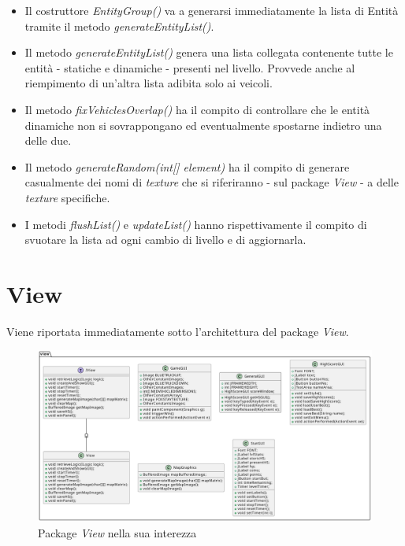 \documentclass[12pt,a4paper]{report}
\begin{document}
\begin{itemize}
\begin{itemize}
		\begin{itemize}
			\item Il costruttore \emph{EntityGroup()} va a generarsi immediatamente la lista di Entità tramite il metodo \emph{generateEntityList()}.
			\item Il metodo \emph{generateEntityList()} genera una lista collegata contenente tutte le entità - statiche e dinamiche - presenti nel livello. Provvede anche al riempimento di un'altra lista adibita solo ai veicoli.
			\item Il metodo \emph{fixVehiclesOverlap()} ha il compito di controllare che le entità dinamiche non si sovrappongano ed eventualmente spostarne indietro una delle due.
			\item Il metodo \emph{generateRandom(int[] element)} ha il compito di generare casualmente dei nomi di \emph{texture} che si riferiranno - sul package \emph{View} - a delle \emph{texture} specifiche.
			\item I metodi \emph{flushList()} e \emph{updateList()} hanno rispettivamente il compito di svuotare la lista ad ogni cambio di livello e di aggiornarla.
		\end{itemize}
	\end{itemize}
\end{itemize}




\section{View}\label{se:arch.view}

Viene riportata immediatamente sotto l'architettura del package \emph{View}.

\begin{figure}[H]
	\centering
	\includegraphics[width=1\textwidth]{View.pdf}
	\caption{Package \emph{View} nella sua interezza}
	\label{fig:View}
\end{figure}
\end{document}

